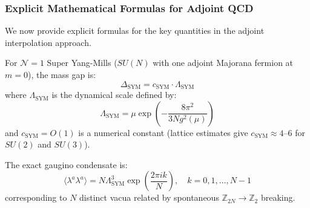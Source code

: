 \subsubsection{Explicit Mathematical Formulas for Adjoint QCD}
\label{sec:adjoint-explicit}

We now provide explicit formulas for the key quantities in the adjoint 
interpolation approach.

\begin{theorem}
\label{thm:susy-gap-explicit}
For $\mathcal{N}=1$ Super Yang-Mills ($SU(N)$ with one adjoint Majorana fermion 
at $m = 0$), the mass gap is:
\[
\Delta_{\mathrm{SYM}} = c_{\mathrm{SYM}} \cdot \Lambda_{\mathrm{SYM}}
\]
where $\Lambda_{\mathrm{SYM}}$ is the dynamical scale defined by:
\[
\Lambda_{\mathrm{SYM}} = \mu \exp\left(-\frac{8\pi^2}{3N g^2(\mu)}\right)
\]
and $c_{\mathrm{SYM}} = O(1)$ is a numerical constant (lattice estimates give 
$c_{\mathrm{SYM}} \approx 4$--$6$ for $SU(2)$ and $SU(3)$).

The exact gaugino condensate is:
\[
\langle \lambda^a \lambda^a \rangle = N \Lambda_{\mathrm{SYM}}^3 \exp\left(\frac{2\pi i k}{N}\right), \quad k = 0, 1, \ldots, N-1
\]
corresponding to $N$ distinct vacua related by spontaneous $\mathbb{Z}_{2N} \to \mathbb{Z}_2$ breaking.
\end{theorem}

